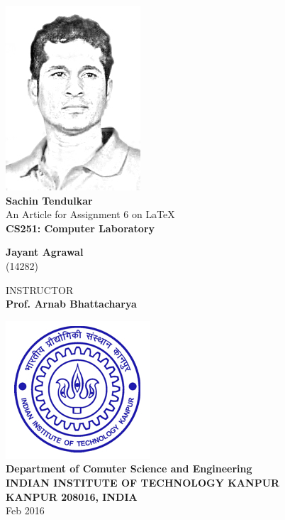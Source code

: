 \documentclass{article}
\begin{document}


\begin{center}
\includegraphics[width=0.3\columnwidth]{Sachin.jpg}\\
\vspace{10pt}
\textbf{\Huge Sachin Tendulkar} \\
\vspace{20pt}
{\large An Article for Assignment 6 on \LaTeX } \\
\textbf{\large CS251: Computer Laboratory} \\
\vspace{30pt}

\textbf{\large Jayant Agrawal} \\
(14282)
\vspace{20pt}

INSTRUCTOR \\
\textbf{Prof. Arnab Bhattacharya}
\vspace{30pt}

\includegraphics[width=0.3\columnwidth]{logo.jpg}\\
\textbf{\large Department of Comuter Science and Engineering \\
INDIAN INSTITUTE OF TECHNOLOGY KANPUR \\
KANPUR 208016, INDIA \\ }
\vspace{10pt}
Feb 2016

\end{center}
\newpage
{}
\end{document}
